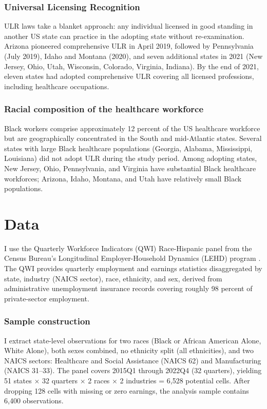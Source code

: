 \documentclass[12pt]{article}
\begin{document}
\subsubsection*{Universal Licensing Recognition} ULR laws take a blanket approach: any individual licensed in good standing in another US state can practice in the adopting state without re-examination. Arizona pioneered comprehensive ULR in April 2019, followed by Pennsylvania (July 2019), Idaho and Montana (2020), and seven additional states in 2021 (New Jersey, Ohio, Utah, Wisconsin, Colorado, Virginia, Indiana). By the end of 2021, eleven states had adopted comprehensive ULR covering all licensed professions, including healthcare occupations.

\subsubsection*{Racial composition of the healthcare workforce} Black workers comprise approximately 12 percent of the US healthcare workforce but are geographically concentrated in the South and mid-Atlantic states. Several states with large Black healthcare populations (Georgia, Alabama, Mississippi, Louisiana) did not adopt ULR during the study period. Among adopting states, New Jersey, Ohio, Pennsylvania, and Virginia have substantial Black healthcare workforces; Arizona, Idaho, Montana, and Utah have relatively small Black populations.

\section{Data}

I use the Quarterly Workforce Indicators (QWI) Race-Hispanic panel from the Census Bureau's Longitudinal Employer-Household Dynamics (LEHD) program \citep{abowd2009lehd}. The QWI provides quarterly employment and earnings statistics disaggregated by state, industry (NAICS sector), race, ethnicity, and sex, derived from administrative unemployment insurance records covering roughly 98 percent of private-sector employment.

\subsubsection*{Sample construction} I extract state-level observations for two races (Black or African American Alone, White Alone), both sexes combined, no ethnicity split (all ethnicities), and two NAICS sectors: Healthcare and Social Assistance (NAICS 62) and Manufacturing (NAICS 31--33). The panel covers 2015Q1 through 2022Q4 (32 quarters), yielding 51 states $\times$ 32 quarters $\times$ 2 races $\times$ 2 industries = 6,528 potential cells. After dropping 128 cells with missing or zero earnings, the analysis sample contains 6,400 observations.
\end{document}
